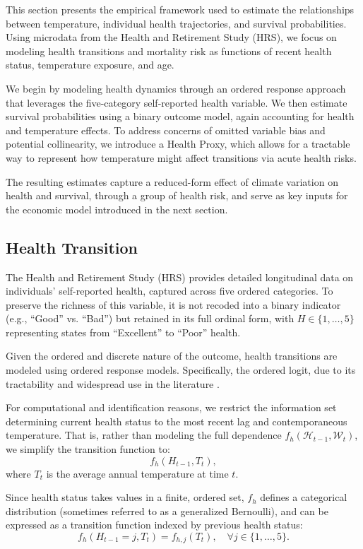 \documentclass{article}
\begin{document}
This section presents the empirical framework used to estimate
the relationships between temperature,
individual health trajectories, and survival probabilities.
Using microdata from the Health and Retirement Study (HRS),
we focus on modeling health transitions and mortality risk
as functions of recent health status, temperature exposure, and age.

We begin by modeling health dynamics through an ordered response approach that
leverages the five-category self-reported health variable.
We then estimate survival probabilities using a binary outcome model,
again accounting for health and temperature effects.
To address concerns of omitted variable bias and potential collinearity, 
we introduce a Health Proxy, which allows for a tractable way to represent how
temperature might affect transitions via acute health risks. 

The resulting estimates capture a reduced-form
effect of climate variation on health and survival,
through a group of health risk,
and serve as key inputs for the economic
model introduced in the next section.

\subsection{Health Transition}

The Health and Retirement Study (HRS) provides detailed longitudinal data on individuals’ self-reported health, captured across five ordered categories.
To preserve the richness of this variable, it is not recoded into a binary indicator (e.g., “Good” vs. “Bad”) but retained in its full ordinal form, with $H \in \{1,\dots,5\}$ representing states from “Excellent” to “Poor” health.

Given the ordered and discrete nature of the outcome, health transitions are modeled using ordered response models. 
Specifically, the ordered logit, due to its tractability and widespread use in the literature \cite{Wooldridge_2010}.

For computational and identification reasons, we restrict the information set determining current health status to the most recent lag and contemporaneous temperature. That is, rather than modeling the full dependence $f_h(\mathcal{H}_{t-1}, \mathcal{W}_{t})$, we simplify the transition function to:
\[
f_{h}(H_{t-1}, T_{t}),
\]
where $T_t$ is the average annual temperature at time $t$.

Since health status takes values in a finite, ordered set, $f_h$ defines a categorical distribution (sometimes referred to as a generalized Bernoulli), and can be expressed as a transition function indexed by previous health status:
\[
f_{h}(H_{t-1} = j, T_{t}) = f_{h,j}(T_{t}), \quad \forall j \in \{1,\dots,5\}.
\]
\end{document}
